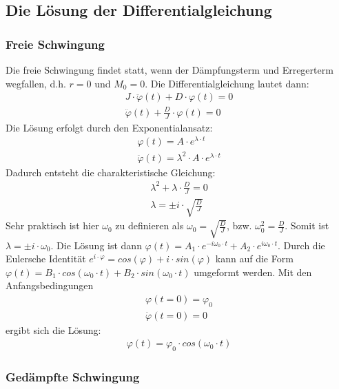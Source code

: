 \documentclass{article}
\begin{document}
\subsection{Die Lösung der Differentialgleichung}
\subsubsection{Freie Schwingung}
Die freie Schwingung findet statt, wenn der Dämpfungsterm und Erregerterm wegfallen, d.h. $r = 0$ und $M_{0} = 0$.
Die Differentialgleichung lautet dann:
\begin{gather} \label{eq:freie_schwingung}
    J \cdot \ddot \varphi(t) + D \cdot \varphi(t) = 0\\
    \ddot \varphi(t) + \frac{D}{J} \cdot \varphi(t) = 0
\end{gather}
Die Lösung erfolgt durch den Exponentialansatz:
\begin{gather} \label{eq:freie_schwingung_ansatz}
    \varphi(t) = A \cdot e^{\lambda \cdot t}\\
    \ddot \varphi(t) = \lambda^{2} \cdot A \cdot e^{\lambda \cdot t}
\end{gather}
Dadurch entsteht die charakteristische Gleichung:
\begin{gather} \label{eq:freie_schwingung_char_gl}
    \lambda^{2} + \lambda \cdot \frac{D}{J} = 0\\
    \lambda = \pm i \cdot \sqrt{\frac{D}{J}}
\end{gather}
Sehr praktisch ist hier $\omega_{0}$ zu definieren als $\omega_{0} = \sqrt{\frac{D}{J}}$, bzw. $\omega_{0}^{2} = \frac{D}{J}$.
Somit ist $\lambda = \pm i \cdot \omega_{0}$. Die Lösung ist dann
$\varphi(t) = A_{1} \cdot e^{-i \omega_{0} \cdot t} + A_{2} \cdot e^{i \omega_{0} \cdot t}$.
Durch die Eulersche Identität $e^{i \cdot \varphi} = cos(\varphi) + i \cdot sin(\varphi)$ kann auf die Form
$\varphi(t) = B_{1} \cdot cos(\omega_{0} \cdot t) + B_{2} \cdot sin(\omega_{0} \cdot t)$ umgeformt werden. Mit den Anfangsbedingungen
\begin{gather} \label{eq:freie_schwingung_anfangsbed}
    \varphi(t = 0) = \varphi_{0}\\
    \dot \varphi(t = 0) = 0
\end{gather}
ergibt sich die Lösung:
\begin{gather} \label{eq:freie_schwingung_loesung}
    \varphi(t) = \varphi_{0} \cdot cos(\omega_{0} \cdot t)
\end{gather}
\subsubsection{Gedämpfte Schwingung}
\end{document}
